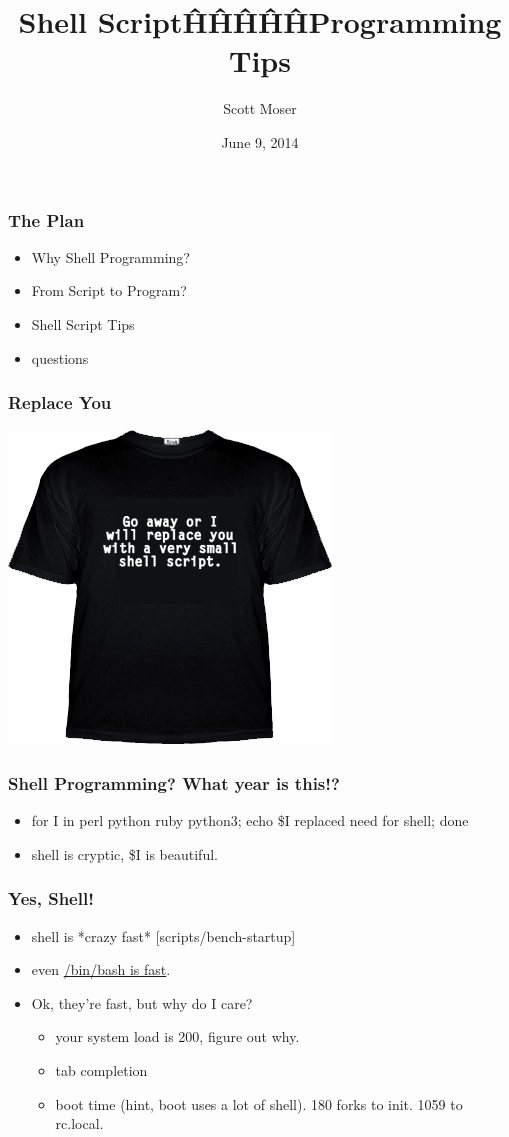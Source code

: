 \documentclass{beamer}
\author{Scott Moser}
\title{Shell Script\^H\^H\^H\^H\^HProgramming Tips}
\institute{Michigan!/usr/group}
\date{June 9, 2014}
\begin{document}
\begin{frame}[t,plain]
    \titlepage
\end{frame}

\begin{frame}
   \frametitle{The Plan}
   \begin{itemize}
      \item Why Shell Programming?
      \item From Script to Program?
      \item Shell Script Tips
      \item questions
   \end{itemize}
\end{frame}

\begin{frame}
   \frametitle{Replace You}
   \includegraphics{replace-you}
\end{frame}

\begin{frame}
   \frametitle{Shell Programming?  What year is this!?}
   \begin{itemize}
      \item for I in perl python ruby python3; echo \$I replaced need for shell; done
      \item shell is cryptic, \$I is beautiful.
   \end{itemize}
\end{frame}

\begin{frame}
   \frametitle{Yes, Shell!}
   \begin{itemize}
      \item shell is *crazy fast* [scripts/bench-startup]
      \item even \href{https://gist.github.com/smoser/9780744}{/bin/bash is fast}.
      \item Ok, they're fast, but why do I care?
      \begin{itemize}
         \item your system load is 200, figure out why.
         \item tab completion
         \item boot time (hint, boot uses a lot of shell). 180 forks to init. 1059 to rc.local.
      \end{itemize}
   \end{itemize}
\end{frame}
\end{document}
